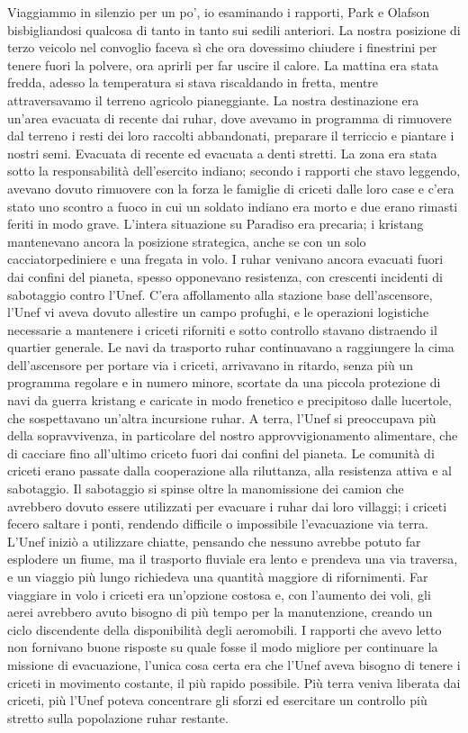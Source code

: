 Viaggiammo in silenzio per un po', io esaminando i rapporti, Park e
Olafson bisbigliandosi qualcosa di tanto in tanto sui sedili anteriori.
La nostra posizione di terzo veicolo nel convoglio faceva sì che ora
dovessimo chiudere i finestrini per tenere fuori la polvere, ora aprirli
per far uscire il calore. La mattina era stata fredda, adesso la
temperatura si stava riscaldando in fretta, mentre attraversavamo il
terreno agricolo pianeggiante. La nostra destinazione era un'area
evacuata di recente dai ruhar, dove avevamo in programma di rimuovere
dal terreno i resti dei loro raccolti abbandonati, preparare il
terriccio e piantare i nostri semi. Evacuata di recente ed evacuata a
denti stretti. La zona era stata sotto la responsabilità dell'esercito
indiano; secondo i rapporti che stavo leggendo, avevano dovuto rimuovere
con la forza le famiglie di criceti dalle loro case e c'era stato uno
scontro a fuoco in cui un soldato indiano era morto e due erano rimasti
feriti in modo grave. L'intera situazione su Paradiso era precaria; i
kristang mantenevano ancora la posizione strategica, anche se con un
solo cacciatorpediniere e una fregata in volo. I ruhar venivano ancora
evacuati fuori dai confini del pianeta, spesso opponevano resistenza,
con crescenti incidenti di sabotaggio contro l'Unef. C'era affollamento
alla stazione base dell'ascensore, l'Unef vi aveva dovuto allestire un
campo profughi, e le operazioni logistiche necessarie a mantenere i
criceti riforniti e sotto controllo stavano distraendo il quartier
generale. Le navi da trasporto ruhar continuavano a raggiungere la cima
dell'ascensore per portare via i criceti, arrivavano in ritardo, senza
più un programma regolare e in numero minore, scortate da una piccola
protezione di navi da guerra kristang e caricate in modo frenetico e
precipitoso dalle lucertole, che sospettavano un'altra incursione ruhar.
A terra, l'Unef si preoccupava più della sopravvivenza, in particolare
del nostro approvvigionamento alimentare, che di cacciare fino
all'ultimo criceto fuori dai confini del pianeta. Le comunità di criceti
erano passate dalla cooperazione alla riluttanza, alla resistenza attiva
e al sabotaggio. Il sabotaggio si spinse oltre la manomissione dei
camion che avrebbero dovuto essere utilizzati per evacuare i ruhar dai
loro villaggi; i criceti fecero saltare i ponti, rendendo difficile o
impossibile l'evacuazione via terra. L'Unef iniziò a utilizzare chiatte,
pensando che nessuno avrebbe potuto far esplodere un fiume, ma il
trasporto fluviale era lento e prendeva una via traversa, e un viaggio
più lungo richiedeva una quantità maggiore di rifornimenti. Far
viaggiare in volo i criceti era un'opzione costosa e, con l'aumento dei
voli, gli aerei avrebbero avuto bisogno di più tempo per la
manutenzione, creando un ciclo discendente della disponibilità degli
aeromobili. I rapporti che avevo letto non fornivano buone risposte su
quale fosse il modo migliore per continuare la missione di evacuazione,
l'unica cosa certa era che l'Unef aveva bisogno di tenere i criceti in
movimento costante, il più rapido possibile. Più terra veniva liberata
dai criceti, più l'Unef poteva concentrare gli sforzi ed esercitare un
controllo più stretto sulla popolazione ruhar restante.

